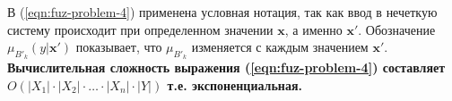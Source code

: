 В (\ref{eqn:fuz-problem-4}) применена условная нотация, так как ввод в нечеткую систему происходит при определенном значении $\mathbf{x}$, а именно $\mathbf{x'}$. Обозначение $\mu_{B'_k}(y | \mathbf{x'})$ показывает, что $\mu_{B'_k}$ изменяется с каждым значением $\mathbf{x'}$. \textbf{Вычислительная сложность выражения (\ref{eqn:fuz-problem-4}) составляет ${O(|X_1|\cdot |X_2|\cdot \dots \cdot |X_n|\cdot |Y|)}$ т.е. экспоненциальная.}





